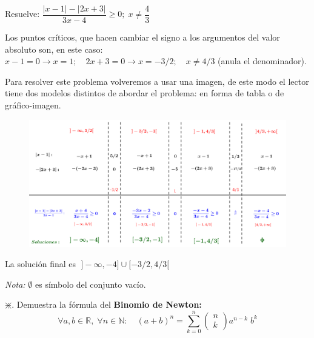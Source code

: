 		
		\begin{ejre}
			Resuelve: $\dfrac {|x-1|-|2x+3|}{3x-4}\ge 0;\; x\neq \dfrac 4 3$
		\end{ejre}
		\begin{proofw}\renewcommand{\qedsymbol}{$\diamond$}
		
				Los puntos críticos, que hacen cambiar el signo a los argumentos del valor absoluto son, en este caso: $x-1=0 \to  x=1; \quad 2x+3=0 \to x=-3/2;\quad x\neq 4/3$ (anula el denominador).
				
				 Para resolver este problema volveremos a usar una imagen, de este modo el lector tiene dos modelos distintos de abordar el problema: en forma de tabla o de gráfico-imagen.
				
			\begin{figure}[H]
			\centering
				\includegraphics[width=1\textwidth]{imagenes/imagenes01/T01IM06.png}
			\end{figure}
			
			 La solución final es $\; ]-\infty, -4] \cup [-3/2,4/3[$
				
		\end{proofw}
		
	    \emph{Nota:}  $\emptyset$ es símbolo del conjunto vacío.
		
		
		
		\begin{ejre} $\divideontimes$.
			Demuestra la fórmula del \textbf{Binomio de Newton:}	
			\label{ejre:binomio-newton}
			\begin{equation}
				\forall a,b \in \mathbb R,\; \forall n \in \mathbb N: \quad (a+b)^n = \sum_{k=0}^n {\left( \begin{matrix} n \\ k \end{matrix}  \right)a^{n-k}\; b^k}
			\end{equation}
		\end{ejre}
		
